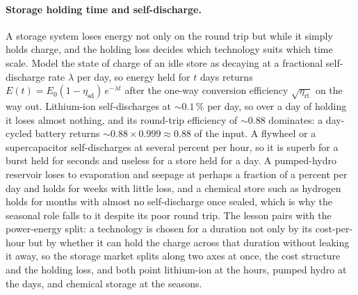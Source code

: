 \paragraph{Storage holding time and self-discharge.} A storage system loses
energy not only on the round trip but while it simply holds charge, and the
holding loss decides which technology suits which time scale. Model the state
of charge of an idle store as decaying at a fractional self-discharge rate
$\lambda$ per day, so energy held for $t$ days returns $E(t) = E_0
(1-\eta_{\text{sd}})\,e^{-\lambda t}$ after the one-way conversion efficiency
$\sqrt{\eta_{\text{rt}}}$ on the way out. Lithium-ion self-discharges at
$\sim 0.1\,\%$ per day, so over a day of holding it loses almost nothing, and
its round-trip efficiency of $\sim 0.88$ dominates: a day-cycled battery
returns $\sim 0.88 \times 0.999 \approx 0.88$ of the input. A flywheel or a
supercapacitor self-discharges at several percent per hour, so it is superb
for a burst held for seconds and useless for a store held for a day. A
pumped-hydro reservoir loses to evaporation and seepage at perhaps a fraction
of a percent per day and holds for weeks with little loss, and a chemical
store such as hydrogen holds for months with almost no
self-discharge once sealed, which is why the seasonal role falls to it despite
its poor round trip. The lesson pairs with the power-energy split: a
technology is chosen for a duration not only by its cost-per-hour but by
whether it can hold the charge across that duration without leaking it away,
so the storage market splits along two axes at once, the cost structure and
the holding loss, and both point lithium-ion at the hours, pumped hydro at the
days, and chemical storage at the seasons.

